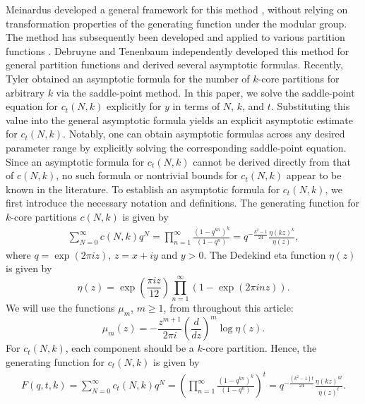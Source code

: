 \documentclass[11pt]{amsart}
\theoremstyle{plain}
\numberwithin{equation}{section}
\begin{document}
	Meinardus developed a general
	framework for this method
	\cite{meinardus1953asymptotische}, without relying on transformation
	properties of the generating function under the modular group. The
	method has subsequently been developed and applied to various
	partition functions
	\cite{murty}. Debruyne and Tenenbaum \cite{debruyne2020saddle} independently developed this method for general partition functions and derived several asymptotic formulas.
	Recently, Tyler \cite{tyler} obtained an asymptotic formula for the number of $k$-core partitions for arbitrary $k$ via the saddle-point method. In this paper, we solve the saddle-point equation for $c_t(N,k)$ explicitly for $y$ in terms of $N$, $k$, and $t$. Substituting this value into the general asymptotic formula yields an explicit asymptotic estimate for $c_t(N,k)$. Notably, one can obtain asymptotic formulas across any desired parameter range by explicitly solving the corresponding saddle-point equation. Since an asymptotic formula for $c_t(N,k)$ cannot be derived directly from that of $c(N,k)$, no such formula or nontrivial bounds for $c_t(N,k)$ appear to be known in the literature. To establish an asymptotic formula for $c_t(N,k)$, we first introduce the necessary notation and definitions.
	The generating function for $k$-core partitions $c(N,k)$ is given by
	\begin{align*}
		\sum_{N=0}^{\infty}c(N,k)q^{N} =\prod_{n=1}^{\infty}\frac{(1-q^{kn})^{k}}{(1-q^{n})}=q^{-\frac{k^{2}-1}{24}}\frac{\eta(kz)^{k}}{\eta(z)},      
	\end{align*}
	where $q=\exp(2\pi iz)$, $z=x+iy$ and $y>0$. The Dedekind eta function $\eta(z)$ is given by
	\begin{equation*}
		\eta(z)=\exp\left(\frac{\pi iz}{12}\right)\prod_{n=1}^{\infty}(1-\exp(2\pi inz)).  
	\end{equation*}
	We will use the functions $\mu_m$, $m\ge 1$, from \cite{tyler} throughout this article:
	\begin{equation}\label{eq-muk}
		\mu_{m}(z)=-\frac{z^{m+1}}{2\pi i} \left(\frac{d}{dz}\right)^{m} \log\eta(z).
	\end{equation}
	For $c_t(N,k)$, each component should be a $k$-core partition.
	Hence, the generating function for $c_t(N,k)$ is given by
	\begin{align*}
		F(q,t,k)=\sum_{N=0}^{\infty}c_t(N,k)q^{N} =\left(\prod_{n=1}^{\infty}\frac{(1-q^{kn})^{k}}{(1-q^{n})}\right)^{t}=q^{-\frac{(k^{2}-1)t}{24}}\frac{\eta(kz)^{kt}}{\eta(z)^{t}}.         
	\end{align*}
\end{document}
